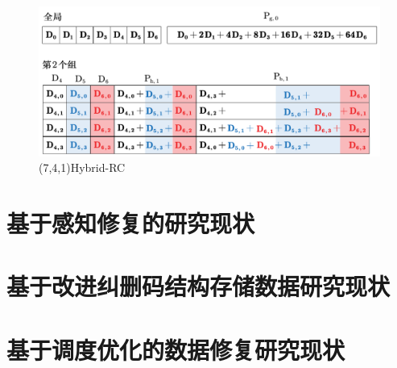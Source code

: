 \begin{figure}[htbp]
	\centering
	\includegraphics [scale=0.7]{figures/2.1.pdf}
	\caption{(7,4,1)Hybrid-RC}
	\label{fig:con-2.1}
\end{figure}


\section{基于感知修复的研究现状}




\section{基于改进纠删码结构存储数据研究现状}
\section{基于调度优化的数据修复研究现状}
